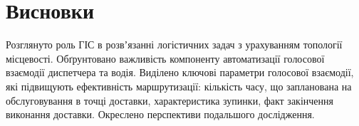 \section{Висновки}

Розглянуто роль ГІС в розвʼязанні логістичних задач з урахуванням топології місцевості. Обґрунтовано важливість компоненту автоматизації голосової взаємодії диспетчера та водія. Виділено ключові параметри голосової взаємодії, які підвищують ефективність маршрутизації: кількість часу, що запланована на обслуговування в точці доставки, характеристика зупинки, факт закінчення виконання доставки. Окреслено перспективи подальшого дослідження.